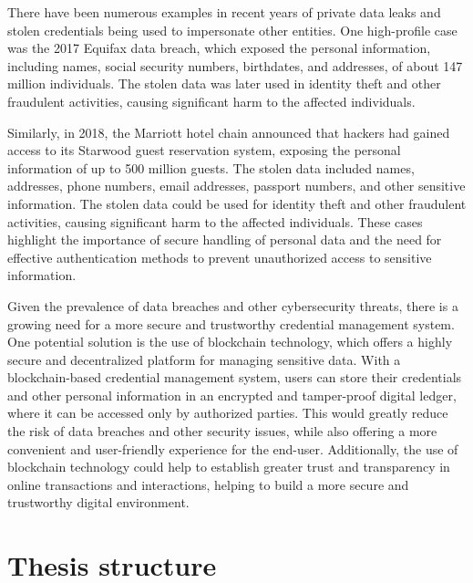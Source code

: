 \documentclass[target=mst,aauheader=]{thud}
\begin{document}
There have been numerous examples in recent years of private data leaks and stolen credentials being used to impersonate other entities. One high-profile case was the 2017 Equifax data breach\cite{equifaxDataBreachSettlement}, which exposed the personal information, including names, social security numbers, birthdates, and addresses, of about 147 million individuals. The stolen data was later used in identity theft and other fraudulent activities, causing significant harm to the affected individuals.\par
Similarly, in 2018, the Marriott hotel chain announced that hackers had gained access to its Starwood guest reservation system\cite{marriotDataBreach}, exposing the personal information of up to 500 million guests. The stolen data included names, addresses, phone numbers, email addresses, passport numbers, and other sensitive information. The stolen data could be used for identity theft and other fraudulent activities, causing significant harm to the affected individuals. These cases highlight the importance of secure handling of personal data and the need for effective authentication methods to prevent unauthorized access to sensitive information.\par
Given the prevalence of data breaches and other cybersecurity threats, there is a growing need for a more secure and trustworthy credential management system. One potential solution is the use of blockchain technology, which offers a highly secure and decentralized platform for managing sensitive data. With a blockchain-based credential management system, users can store their credentials and other personal information in an encrypted and tamper-proof digital ledger, where it can be accessed only by authorized parties. This would greatly reduce the risk of data breaches and other security issues, while also offering a more convenient and user-friendly experience for the end-user. Additionally, the use of blockchain technology could help to establish greater trust and transparency in online transactions and interactions, helping to build a more secure and trustworthy digital environment.


\section{Thesis structure}
\end{document}
